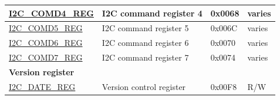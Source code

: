 \begin{longtable}{  | m{5.7cm} | m{7cm} | m{1.3cm} | m{1.5cm} | }
\hyperref[regdesc:I2CCOMD4REG]{I2C\_COMD4\_REG} & I2C command register 4 & 0x0068 & varies \\ \hline
\hyperref[regdesc:I2CCOMD5REG]{I2C\_COMD5\_REG} & I2C command register 5 & 0x006C & varies \\ \hline
\hyperref[regdesc:I2CCOMD6REG]{I2C\_COMD6\_REG} & I2C command register 6 & 0x0070 & varies \\ \hline
\hyperref[regdesc:I2CCOMD7REG]{I2C\_COMD7\_REG} & I2C command register 7 & 0x0074 & varies \\ \hline
\multicolumn{4}{|l|}{\textbf{Version register}} \\ \hline
\hyperref[regdesc:I2CDATEREG]{I2C\_DATE\_REG} & Version control register & 0x00F8 & R/W \\ \hline
\end{longtable}
